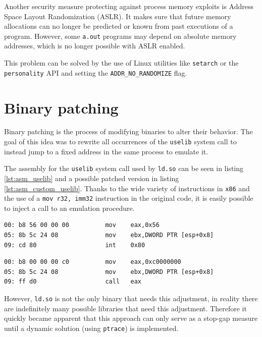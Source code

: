 \documentclass[draft,final]{vutinfth} %
\begin{document}
Another security measure protecting against process memory exploits is Address Space Layout Randomization (ASLR). It makes sure that future memory allocations can no longer be predicted or known from past executions of a program. However, some \texttt{a.out} programs may depend on absolute memory addresses, which is no longer possible with ASLR enabled.

This problem can be solved by the use of Linux utilities like \texttt{setarch} or the \texttt{personality} API and setting the \texttt{ADDR\_NO\_RANDOMIZE} flag.

\section{Binary patching}
\label{explore_binpatch}

Binary patching is the process of modifying binaries to alter their behavior\cite{citation needed}. The goal of this idea was to rewrite all occurrences of the \texttt{uselib} system call to instead jump to a fixed address in the same process to emulate it.

The assembly for the \texttt{uselib} system call used by \texttt{ld.so} can be seen in listing \ref{lst:asm_uselib} and a possible patched version in listing \ref{lst:asm_custom_uselib}. Thanks to the wide variety of instructions in \texttt{x86} and the use of a \texttt{mov r32, imm32} instruction in the original code, it is easily possible to inject a call to an emulation procedure.

\begin{lstlisting}[caption={Assembly for the invocation of the \texttt{uselib} system call as used by \texttt{ld.so}}, label={lst:asm_uselib}]
00:	b8 56 00 00 00       	mov    eax,0x56
05:	8b 5c 24 08          	mov    ebx,DWORD PTR [esp+0x8]
09:	cd 80                	int    0x80
\end{lstlisting}

\begin{lstlisting}[caption={A possible patch replacing the system call with a call to our custom handler located at (for example) \texttt{0xc000\_0000}}, label={lst:asm_custom_uselib}]
00:	b8 00 00 00 c0       	mov    eax,0xc0000000
05:	8b 5c 24 08          	mov    ebx,DWORD PTR [esp+0x8]
09:	ff d0                	call   eax
\end{lstlisting}

However, \texttt{ld.so} is not the only binary that needs this adjustment, in reality there are indefinitely many possible libraries that need this adjustment. Therefore it quickly became apparent that this approach can only serve as a stop-gap measure until a dynamic solution (using \texttt{ptrace}) is implemented.
\end{document}
